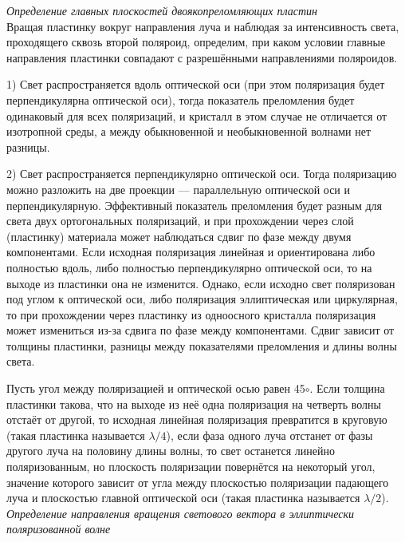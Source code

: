 \documentclass[a4paper, 12pt]{article}%
\begin{document}
	\textit{Определение главных плоскостей двоякопреломляющих пластин}\\
	
	Вращая пластинку вокруг направления луча и наблюдая за интенсивность света, проходящего сквозь второй поляроид, определим, при каком условии главные направления пластинки совпадают с разрешёнными направлениями поляроидов.
	
	1) Свет распространяется вдоль оптической оси (при этом поляризация будет перпендикулярна оптической оси), тогда показатель преломления будет одинаковый для всех поляризаций, и кристалл в этом случае не отличается от изотропной среды, а между обыкновенной и необыкновенной волнами нет разницы.
	
	2) Свет распространяется перпендикулярно оптической оси. Тогда поляризацию можно разложить на две проекции — параллельную оптической оси и перпендикулярную. Эффективный показатель преломления будет разным для света двух ортогональных поляризаций, и при прохождении через слой (пластинку) материала может наблюдаться сдвиг по фазе между двумя компонентами. Если исходная поляризация линейная и ориентирована либо полностью вдоль, либо полностью перпендикулярно оптической оси, то на выходе из пластинки она не изменится. Однако, если исходно свет поляризован под углом к оптической оси, либо поляризация эллиптическая или циркулярная, то при прохождении через пластинку из одноосного кристалла поляризация может измениться из-за сдвига по фазе между компонентами. Сдвиг зависит от толщины пластинки, разницы между показателями преломления и длины волны света.
	
	Пусть угол между поляризацией и оптической осью равен 45$\circ$. Если толщина пластинки такова, что на выходе из неё одна поляризация на четверть волны отстаёт от другой, то исходная линейная поляризация превратится в круговую (такая пластинка называется $\lambda/4$), если фаза одного луча отстанет от фазы другого луча на половину длины волны, то свет останется линейно поляризованным, но плоскость поляризации повернётся на некоторый угол, значение которого зависит от угла между плоскостью поляризации падающего луча и плоскостью главной оптической оси (такая пластинка называется $\lambda/2$).\\
	
	
	\textit{Определение направления вращения светового вектора в
		эллиптически поляризованной волне}\\
\end{document}
